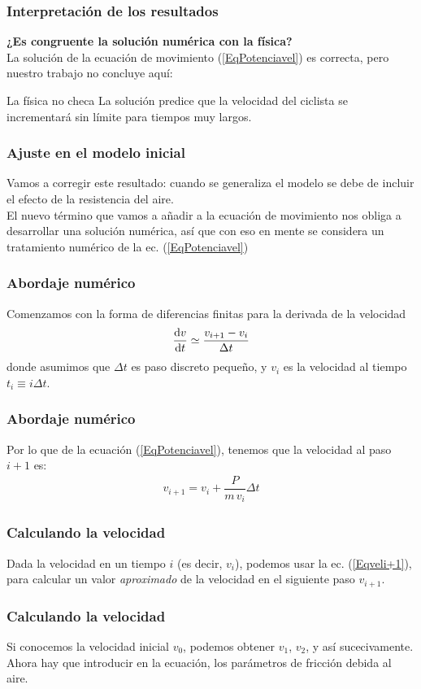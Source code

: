 \begin{frame}
\frametitle{Interpretación de los resultados}
\textbf{¿Es congruente la solución numérica con la física?}
\\
\bigskip
\pause
La solución de la ecuación de movimiento (\ref{EqPotenciavel}) es correcta, pero nuestro trabajo no concluye aquí:
\pause
\begin{alertblock}{La física no checa}
La solución predice que la velocidad del ciclista se incrementará sin límite para tiempos muy largos.
\end{alertblock}
\end{frame}
\begin{frame}
\frametitle{Ajuste en el modelo inicial}
Vamos a corregir este resultado: cuando se generaliza el modelo se debe de incluir el efecto de la resistencia del aire.
\\
\bigskip
\pause
El nuevo término que vamos a añadir a la ecuación de movimiento nos obliga a desarrollar una solución numérica, así que con eso en mente se considera un tratamiento numérico de la ec. (\ref{EqPotenciavel})
\end{frame}
\begin{frame}
\frametitle{Abordaje numérico}
Comenzamos con la forma de diferencias finitas para la derivada de la velocidad
\begin{align}
\dv{v}{t} \simeq \dfrac{v_{i+1} - v_{i}}{\Delta t}
\label{Eqderivada}
\end{align}
donde asumimos que $\Delta t$ es paso discreto pequeño, y $v_{i}$ es la velocidad al tiempo $t_{i} \equiv i \Delta t$.
\end{frame}
\begin{frame}
\frametitle{Abordaje numérico}
Por lo que de la ecuación (\ref{EqPotenciavel}), tenemos que la velocidad al paso $i+1$ es:
\begin{align}
v_{i+1} = v_{i} + \dfrac{P}{m \, v_{i}} \Delta t
\label{Eqveli+1}
\end{align}
\end{frame}
\begin{frame}
\frametitle{Calculando la velocidad}
Dada la velocidad en un tiempo $i$ (es decir, $v_{i}$), podemos usar la ec. (\ref{Eqveli+1}), para calcular un valor \textit{aproximado} de la velocidad en el siguiente paso $v_{i+1}$.
\end{frame}
\begin{frame}
\frametitle{Calculando la velocidad}
Si conocemos la velocidad inicial $v_{0}$, podemos obtener $v_{1}$, $v_{2}$, y así sucecivamente.
\\
\bigskip
Ahora hay que introducir en la ecuación, los parámetros de fricción debida al aire.
\end{frame}
